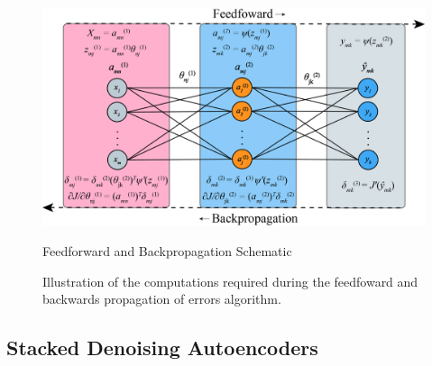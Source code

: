 \begin{figure}[h!]
    \centering
    \includegraphics[width=\textwidth]{img/backprop.png}
    \caption{Feedforward and Backpropagation Schematic}
    \label{fig:backprop}
    \caption{Illustration of the computations required during the feedfoward and backwards propagation of errors algorithm.}
\end{figure}







\subsection{Stacked Denoising Autoencoders}


